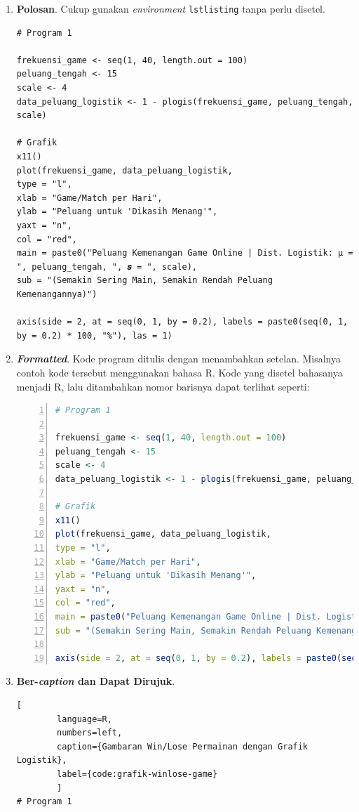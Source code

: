 \begin{enumerate}[]
    \item \textbf{Polosan}. Cukup gunakan \textit{environment} \texttt{lstlisting} tanpa perlu disetel.
    
    \begin{lstlisting}
# Program 1

frekuensi_game <- seq(1, 40, length.out = 100)
peluang_tengah <- 15
scale <- 4
data_peluang_logistik <- 1 - plogis(frekuensi_game, peluang_tengah, scale)

# Grafik
x11()
plot(frekuensi_game, data_peluang_logistik,
type = "l",
xlab = "Game/Match per Hari",
ylab = "Peluang untuk 'Dikasih Menang'",
yaxt = "n",
col = "red",
main = paste0("Peluang Kemenangan Game Online | Dist. Logistik: μ = ", peluang_tengah, ", 𝒔 = ", scale),
sub = "(Semakin Sering Main, Semakin Rendah Peluang Kemenangannya)")

axis(side = 2, at = seq(0, 1, by = 0.2), labels = paste0(seq(0, 1, by = 0.2) * 100, "%"), las = 1)
    \end{lstlisting}
    
    \item \textbf{\textit{Formatted}}. Kode program ditulis dengan menambahkan setelan. Misalnya contoh kode tersebut menggunakan bahasa R. Kode yang disetel bahasanya menjadi R, lalu ditambahkan nomor barisnya dapat terlihat seperti:
    
    \begin{lstlisting}[language=R, numbers=left]
# Program 1

frekuensi_game <- seq(1, 40, length.out = 100)
peluang_tengah <- 15
scale <- 4
data_peluang_logistik <- 1 - plogis(frekuensi_game, peluang_tengah, scale)

# Grafik
x11()
plot(frekuensi_game, data_peluang_logistik,
type = "l",
xlab = "Game/Match per Hari",
ylab = "Peluang untuk 'Dikasih Menang'",
yaxt = "n",
col = "red",
main = paste0("Peluang Kemenangan Game Online | Dist. Logistik: μ = ", peluang_tengah, ", 𝒔 = ", scale),
sub = "(Semakin Sering Main, Semakin Rendah Peluang Kemenangannya)")

axis(side = 2, at = seq(0, 1, by = 0.2), labels = paste0(seq(0, 1, by = 0.2) * 100, "%"), las = 1)
    \end{lstlisting}
    
    \item \textbf{Ber-\textit{caption} dan Dapat Dirujuk}. 
    
    \begin{lstlisting}[
        language=R, 
        numbers=left,
        caption={Gambaran Win/Lose Permainan dengan Grafik Logistik},
        label={code:grafik-winlose-game}
        ]
# Program 1


\end{lstlisting}
\end{enumerate}
